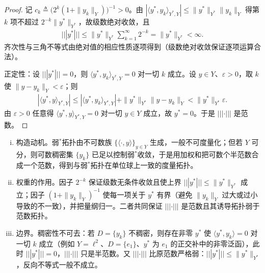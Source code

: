 \documentclass[../main.tex]{subfiles}
\begin{document}
\begin{proof}
记 $c_k\triangleq\bigl(2^k(1+\|y_k\|_Y)\bigr)^{-1}>0$。由 $|\langle y^*,y_k\rangle_{Y^*,Y}|\leqslant\|y^*\|_{Y^*}\|y_k\|_Y$ 得第 $k$ 项不超过 $2^{-k}\|y^*\|_{Y^*}$，故级数绝对收敛，且
\begin{align*}
|||y^*|||\leqslant\|y^*\|_{Y^*}\sum_{k=1}^\infty2^{-k}=\|y^*\|_{Y^*}<\infty.
\end{align*}
齐次性与三角不等式由绝对值的相应性质逐项得到（级数绝对收敛保证逐项运算合法）。

正定性：设 $|||y^*|||=0$，则 $\langle y^*,y_k\rangle_{Y^*,Y}=0$ 对一切 $k$ 成立。设 $y\in Y$、$\varepsilon>0$，取 $k$ 使 $\|y-y_k\|_Y<\varepsilon$；则
\begin{align*}
|\langle y^*,y\rangle_{Y^*,Y}|\leqslant|\langle y^*,y_k\rangle_{Y^*,Y}|+\|y^*\|_{Y^*}\|y-y_k\|_Y<\|y^*\|_{Y^*}\varepsilon .
\end{align*}
由 $\varepsilon>0$ 任意得 $\langle y^*,y\rangle_{Y^*,Y}=0$ 对一切 $y\in Y$ 成立，故 $y^*=0$。于是 $|||\cdot|||$ 是范数。
\end{proof}

\begin{remark}\label{remark:appA-Ystar范数}
\begin{enumerate}[(i)]
\item 构造动机。弱$^*$拓扑由不可数族 $\{\langle\cdot,y\rangle\}_{y\in Y}$ 生成，一般不可度量化；但若 $Y$ 可分，则可数稠密集 $\{y_k\}$ 已足以控制弱$^*$收敛，于是用加权和把可数个半范数合成一个范数，得到与弱$^*$拓扑在单位球上一致的度量拓扑。
\item 权重的作用。因子 $2^{-k}$ 保证级数无条件收敛且使上界 $|||y^*|||\leqslant\|y^*\|_{Y^*}$ 成立；因子 $(1+\|y_k\|_Y)^{-1}$ 使每一项关于 $y^*$ 有界（避免 $\|y_k\|_Y$ 过大或过小导致的不一致），并把量纲归一。二者共同保证 $|||\cdot|||$ 是范数且其诱导拓扑弱于范数拓扑。
\item 边界。稠密性不可去：若 $D=\{y_k\}$ 不稠密，则存在非零 $y^*$ 使 $\langle y^*,y_k\rangle=0$ 对一切 $k$ 成立（例如 $Y=\ell^2$、$D=\{e_1\}$、$y^*$ 为 $e_1$ 的正交补中的非零泛函），此时 $|||y^*|||=0$，$|||\cdot|||$ 只是半范数。又 $|||\cdot|||$ 比原范数严格弱：$|||y^*|||\leqslant\|y^*\|_{Y^*}$，反向不等式一般不成立。
\end{enumerate}
\end{remark}
\end{document}
